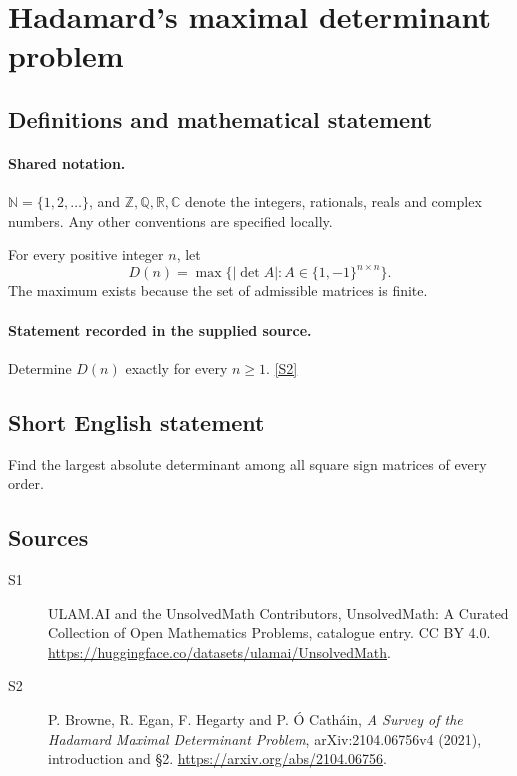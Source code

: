\documentclass[11pt]{article}
\newcommand{\sref}[2]{\hyperlink{source:#1:#2}{[S#2]}}
\begin{document}
\section{Hadamard's maximal determinant problem}\label{statement}

\subsection{Definitions and mathematical statement}

\paragraph{Shared notation.}$\mathbb N=\{1,2,\ldots\}$, and $\mathbb Z,\mathbb Q,\mathbb R,\mathbb C$ denote the integers, rationals, reals and complex numbers. Any other conventions are specified locally.


For every positive integer $n$, let
\[D(n)=\max\{|\det A|:A\in\{1,-1\}^{n\times n}\}.
\]
The maximum exists because the set of admissible matrices is finite.
\paragraph{Statement recorded in the supplied source.}
Determine $D(n)$ exactly for every $n\geq1$. \sref{statement}{2}
\subsection{Short English statement}
Find the largest absolute determinant among all square sign matrices of every order.
\subsection{Sources}
\begin{description}
\item[\hypertarget{source:statement:1}{S1}] ULAM.AI and the UnsolvedMath Contributors, UnsolvedMath: A Curated Collection of Open Mathematics Problems, catalogue entry. CC BY 4.0. \url{https://huggingface.co/datasets/ulamai/UnsolvedMath}.
\item[\hypertarget{source:statement:2}{S2}] P. Browne, R. Egan, F. Hegarty and P. Ó Catháin, \emph{A Survey of the Hadamard Maximal Determinant Problem}, arXiv:2104.06756v4 (2021), introduction and §2. \url{https://arxiv.org/abs/2104.06756}.
\end{description}
\label{end:statement}
\end{document}
